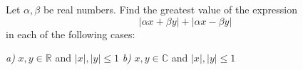 Let $ \alpha ,\beta $ be real numbers. Find the greatest value of the expression
$$ |\alpha x +\beta y| +|\alpha x-\beta y| $$in each of the following cases:

\textit{a)} $ x,y\in \mathbb{R} $ and $ |x|,|y|\le 1 $
\textit{b)} $ x,y\in \mathbb{C} $ and $ |x|,|y|\le 1 $
